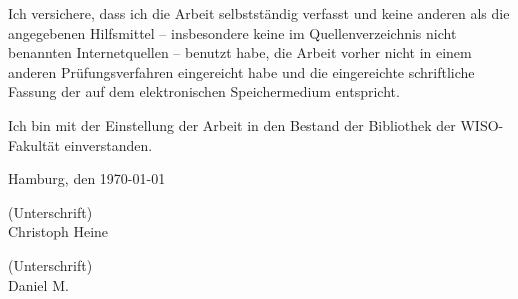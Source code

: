 \documentclass[12pt]{scrartcl}
\begin{document}
	Ich versichere, dass ich die Arbeit selbstständig verfasst und keine anderen als die angegebenen Hilfsmittel -- insbesondere keine im Quellenverzeichnis nicht benannten Internetquellen -- benutzt habe, die Arbeit vorher nicht in einem anderen Prüfungsverfahren eingereicht habe und die eingereichte schriftliche Fassung der auf dem elektronischen Speichermedium entspricht.
	
	Ich bin mit der Einstellung der Arbeit in den Bestand der Bibliothek der WISO-Fakultät einverstanden.
	
	Hamburg, den \today
	
	\bigskip
	(Unterschrift)\\
	Christoph Heine
	
	\bigskip
	\bigskip
	(Unterschrift)\\
	Daniel M.
\end{document}

